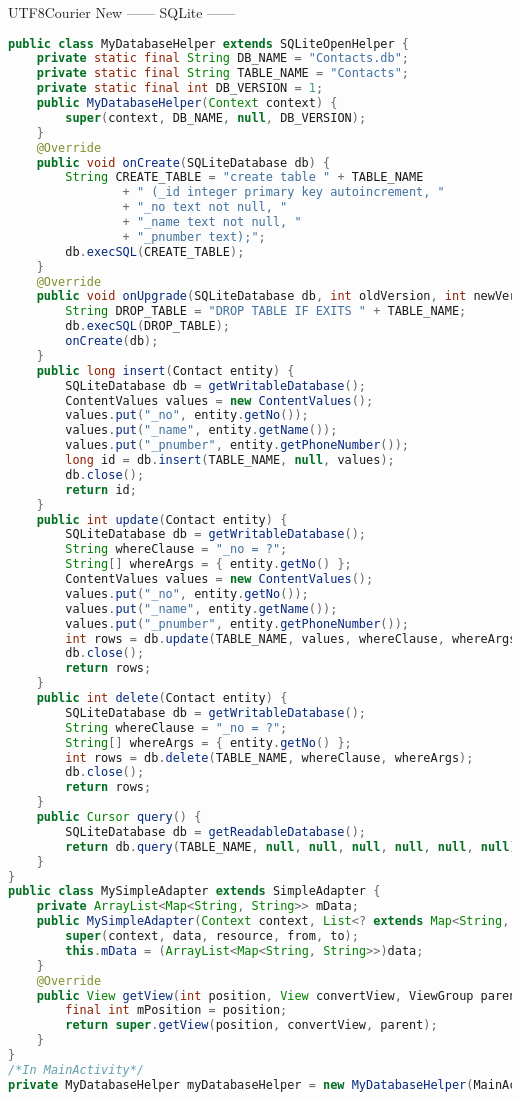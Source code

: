 \documentclass[10pt,a4paper,twocolumn]{report}
\begin{document}
\begin{CJK}{UTF8}{Courier New}
------ SQLite ------
\begin{lstlisting}[language=Java]
public class MyDatabaseHelper extends SQLiteOpenHelper {
	private static final String DB_NAME = "Contacts.db";
	private static final String TABLE_NAME = "Contacts";
	private static final int DB_VERSION = 1;
	public MyDatabaseHelper(Context context) {
		super(context, DB_NAME, null, DB_VERSION);
	}
	@Override
	public void onCreate(SQLiteDatabase db) {
		String CREATE_TABLE = "create table " + TABLE_NAME
				+ " (_id integer primary key autoincrement, "
				+ "_no text not null, "
				+ "_name text not null, "
				+ "_pnumber text);";
		db.execSQL(CREATE_TABLE);
	}
	@Override
	public void onUpgrade(SQLiteDatabase db, int oldVersion, int newVersion) {
		String DROP_TABLE = "DROP TABLE IF EXITS " + TABLE_NAME;
		db.execSQL(DROP_TABLE);
		onCreate(db);
	}
	public long insert(Contact entity) {
		SQLiteDatabase db = getWritableDatabase();
		ContentValues values = new ContentValues();
		values.put("_no", entity.getNo());
		values.put("_name", entity.getName());
		values.put("_pnumber", entity.getPhoneNumber());
		long id = db.insert(TABLE_NAME, null, values);
		db.close();
		return id;
	}
	public int update(Contact entity) {
		SQLiteDatabase db = getWritableDatabase();
		String whereClause = "_no = ?";
		String[] whereArgs = { entity.getNo() };
		ContentValues values = new ContentValues();
		values.put("_no", entity.getNo());
		values.put("_name", entity.getName());
		values.put("_pnumber", entity.getPhoneNumber());
		int rows = db.update(TABLE_NAME, values, whereClause, whereArgs);
		db.close();
		return rows;
	}
	public int delete(Contact entity) {
		SQLiteDatabase db = getWritableDatabase();
		String whereClause = "_no = ?";
		String[] whereArgs = { entity.getNo() };
		int rows = db.delete(TABLE_NAME, whereClause, whereArgs);
		db.close();
		return rows;
	}
	public Cursor query() {
		SQLiteDatabase db = getReadableDatabase();
		return db.query(TABLE_NAME, null, null, null, null, null, null);
	}
}
public class MySimpleAdapter extends SimpleAdapter {
	private ArrayList<Map<String, String>> mData;
	public MySimpleAdapter(Context context, List<? extends Map<String, ?>> data, int resource, String[] from, int[] to) {
		super(context, data, resource, from, to);
		this.mData = (ArrayList<Map<String, String>>)data;
	}
	@Override
	public View getView(int position, View convertView, ViewGroup parent) {
		final int mPosition = position;
		return super.getView(position, convertView, parent);
	}
}
/*In MainActivity*/
private MyDatabaseHelper myDatabaseHelper = new MyDatabaseHelper(MainActivity.this);

\end{lstlisting}
\end{CJK}
\end{document}
